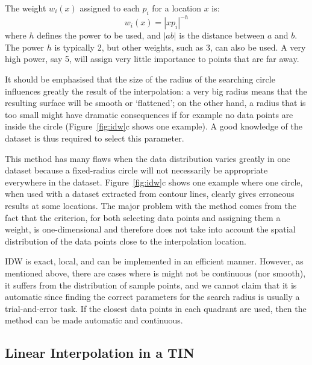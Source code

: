 The weight $w_i(x)$ assigned to each $p_i$ for a location $x$ is:
\begin{equation}
w_i(x) = |xp_i|^{-h}
\end{equation}
where $h$ defines the power to be used, and $|ab|$ is the distance between $a$ and $b$.
The power $h$ is typically 2, but other weights, such as 3, can also be used.
A very high power, say 5, will assign very little importance to points that are far away.

It should be emphasised that the size of the radius of the searching circle influences greatly the result of the interpolation: a very big radius means that the resulting surface will be smooth or `flattened'; on the other hand, a radius that is too small might have dramatic consequences if for example no data points are inside the circle (Figure~\ref{fig:idw}c shows one example).
A good knowledge of the dataset is thus required to select this parameter. 

This method has many flaws when the data distribution varies greatly in one dataset because a fixed-radius circle will not necessarily be appropriate everywhere in the data\-set. 
Figure~\ref{fig:idw}c shows one example where one circle, when used with a dataset extracted from contour lines, clearly gives erroneous results at some locations. 
The major problem with the method comes from the fact that the criterion, for both selecting data points and assigning them a weight, is one-dimensional and therefore does not take into account the spatial distribution of the data points close to the interpolation location.

IDW is exact, local, and can be implemented in an efficient manner.
However, as mentioned above, there are cases where is might not be continuous (nor smooth), it suffers from the distribution of sample points, and we cannot claim that it is automatic since finding the correct parameters for the search radius is usually a trial-and-error task.
If the closest data points in each quadrant are used, then the method can be made automatic and continuous.


\subsection{Linear Interpolation in a TIN}

